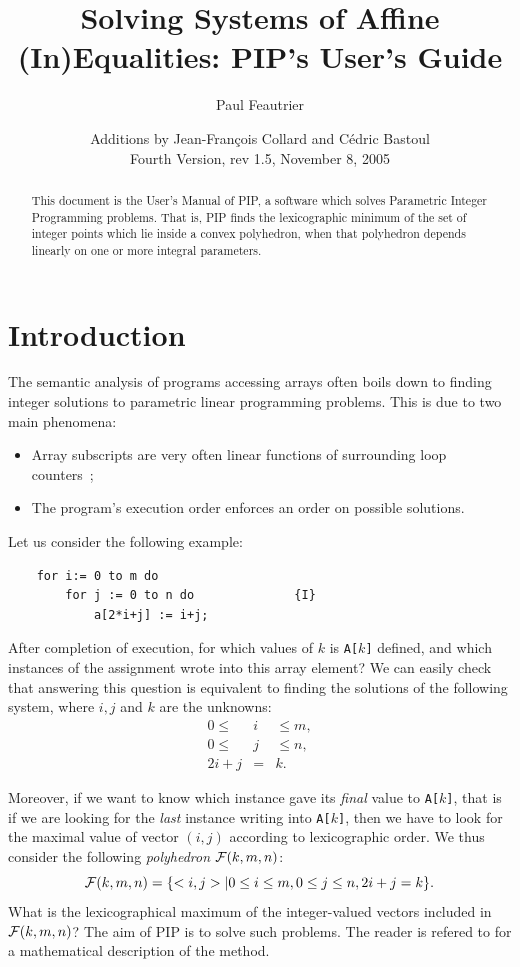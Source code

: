 \documentclass[12pt,a4paper]{article}
\date{Additions by Jean-Fran\c{c}ois Collard and C\'edric Bastoul\\
Fourth Version, rev 1.5, November 8, 2005}
\title{Solving Systems of Affine (In)Equalities: PIP's User's Guide}
\author{Paul Feautrier}
\begin{document}
\pagestyle{headings}

\maketitle


\begin{abstract}
This document is the User's Manual of PIP, a software which solves
Parametric Integer Programming problems. That is, PIP finds the
lexicographic minimum of the set of integer points which lie inside a
convex polyhedron, when that polyhedron depends linearly on one or
more integral parameters. 
\end{abstract}

\section{Introduction}
The semantic analysis of programs accessing arrays often boils down
to finding integer solutions to parametric linear programming problems. This is
due to two main phenomena:
\begin{itemize}
\item Array subscripts are very often linear functions of surrounding loop counters~;
\item The program's execution order enforces an order on possible solutions.
\end{itemize}

Let us consider the following example:
\begin{verbatim}
    for i:= 0 to m do
        for j := 0 to n do              {I}
            a[2*i+j] := i+j;
\end{verbatim}

After completion of execution, for which values of $k$ is {\tt A[}$k${\tt ]}
defined, and which instances of the assignment wrote into
this array element? We can easily check that answering this question
is equivalent to finding the solutions of the following system, where $i,
j$ and $k$ are the unknowns:
\begin{eqnarray}
0 \leq & i & \leq m ,\\
0 \leq & j & \leq n ,\\
2i + j & = & k .
\end{eqnarray}

Moreover, if we want to know which instance gave its {\em final} value
to {\tt A[}$k${\tt ]}, that is if we are looking for the {\em last} instance
writing into {\tt A[}$k${\tt ]}, then we have to look for the maximal value
of vector $(i,j)$ according to lexicographic order. We
thus consider the following {\em polyhedron} ${\cal F}(k, m, n) $:
\begin{equation}
{\cal F}(k, m, n) = \{<i, j>| 0 \leq i \leq m, 0 \leq j \leq n, 2i+j = k\} .
\label{exp1}
\end{equation}
What is the lexicographical maximum of the 
integer-valued vectors included in ${\cal F}(k, m, n)$?
The aim of PIP is to solve such problems. The reader is refered to
\cite{Feau:88b} for a mathematical description of the method.
%
%
\end{document}
